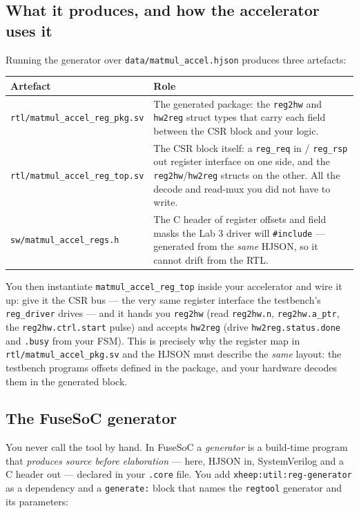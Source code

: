 \documentclass[11pt]{article}
\newcommand{\code}[1]{\texttt{#1}}
\begin{document}
\subsection{What it produces, and how the accelerator uses it}

Running the generator over \code{data/matmul\_accel.hjson} produces three
artefacts:

\begin{center}
\small
\begin{tabular}{@{}lp{9.2cm}@{}}
\toprule
Artefact & Role \\
\midrule
\code{rtl/matmul\_accel\_reg\_pkg.sv}
  & The generated package: the \code{reg2hw} and \code{hw2reg} struct types that
    carry each field between the CSR block and your logic. \\
\addlinespace
\code{rtl/matmul\_accel\_reg\_top.sv}
  & The CSR block itself: a \code{reg\_req} in / \code{reg\_rsp} out register
    interface on one side, and the \code{reg2hw}/\code{hw2reg} structs on the
    other. All the decode and read-mux you did not have to write. \\
\addlinespace
\code{sw/matmul\_accel\_regs.h}
  & The C header of register offsets and field masks the Lab 3 driver will
    \code{\#include} --- generated from the \emph{same} HJSON, so it cannot drift
    from the RTL. \\
\bottomrule
\end{tabular}
\end{center}

You then instantiate \code{matmul\_accel\_reg\_top} inside your accelerator and
wire it up: give it the CSR bus --- the very same register interface the
testbench's \code{reg\_driver} drives --- and it hands you \code{reg2hw} (read
\code{reg2hw.n}, \code{reg2hw.a\_ptr}, the \code{reg2hw.ctrl.start} pulse) and
accepts \code{hw2reg} (drive \code{hw2reg.status.done} and \code{.busy} from your
FSM). This is precisely why the register map in \code{rtl/matmul\_accel\_pkg.sv}
and the HJSON must describe the \emph{same} layout: the testbench programs
offsets defined in the package, and your hardware decodes them in the generated
block.

\subsection{The FuseSoC generator}

You never call the tool by hand. In FuseSoC a \emph{generator} is a build-time
program that \emph{produces source before elaboration} --- here, HJSON in,
SystemVerilog and a C header out --- declared in your \code{.core} file. You add
\code{xheep:util:reg-generator} as a dependency and a \code{generate:} block that
names the \code{regtool} generator and its parameters:
\end{document}
